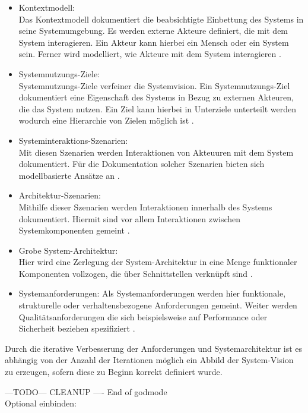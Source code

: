 \begin{itemize}
\item Kontextmodell:\\
Das Kontextmodell dokumentiert die beabsichtigte Einbettung des Systems in seine Systemumgebung. Es werden externe Akteure definiert, die mit dem System interagieren. Ein Akteur kann hierbei ein Mensch oder ein System sein. Ferner wird modelliert, wie Akteure mit dem System interagieren \cite{Poh01}.
\item Systemnutzungs-Ziele:\\
Systemnutzungs-Ziele verfeiner die Systemvision. Ein Systemnutzungs-Ziel dokumentiert eine Eigenschaft des Systems in Bezug zu externen Akteuren, die das System nutzen. Ein Ziel kann hierbei in Unterziele unterteilt werden wodurch eine Hierarchie von Zielen möglich ist \cite{Poh01}.  
\item Systeminteraktions-Szenarien:\\
Mit diesen Szenarien werden Interaktionen von Akteuuren mit dem System dokumentiert. Für die Dokumentation solcher Szenarien bieten sich modellbasierte Ansätze an \cite{Poh01}.
\item Architektur-Szenarien:\\
Mithilfe dieser Szenarien werden Interaktionen innerhalb des Systems dokumentiert. Hiermit sind vor allem Interaktionen zwischen Systemkomponenten gemeint \cite{Poh01}. 
\item Grobe System-Architektur:\\
Hier wird eine Zerlegung der System-Architektur in eine Menge funktionaler Komponenten vollzogen, die über Schnittstellen verknüpft sind \cite{Poh01}.
\item Systemanforderungen:
Als Systemanforderungen werden hier funktionale, strukturelle oder verhaltensbezogene Anforderungen gemeint. Weiter werden Qualitätsanforderungen die sich beispielsweise auf Performance oder Sicherheit beziehen spezifiziert \cite{Poh01}.\\
\end{itemize}

Durch die iterative Verbesserung der Anforderungen und Systemarchitektur ist es abhängig von der Anzahl der Iterationen möglich ein Abbild der System-Vision zu erzeugen, sofern diese zu Beginn korrekt definiert wurde.

---TODO--- CLEANUP ---- End of godmode \\

Optional einbinden:\\

